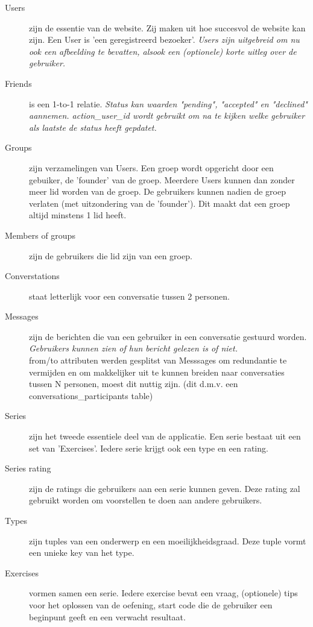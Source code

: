 \begin{description}
    \item[Users] zijn de essentie van de website. Zij maken uit hoe succesvol de website kan zijn.
        Een User is 'een geregistreerd bezoeker'. \textsl{Users zijn uitgebreid om nu ook een afbeelding
        te bevatten, alsook een (optionele) korte uitleg over de gebruiker.}
    \item[Friends] is een 1-to-1 relatie. \textsl{Status kan waarden "pending", "accepted" en "declined" aannemen.
        action\_user\_id wordt gebruikt om na te kijken welke gebruiker als laatste de status heeft gepdatet.}
    \item[Groups] zijn verzamelingen van Users. Een groep wordt opgericht door een gebuiker, de 'founder'
        van de groep. Meerdere Users kunnen dan zonder meer lid worden van de groep. De gebruikers kunnen
        nadien de groep verlaten (met uitzondering van de 'founder'). Dit maakt dat een groep altijd minstens
        1 lid heeft.
    \item[Members of groups] zijn de gebruikers die lid zijn van een groep.
    \item[Converstations] staat letterlijk voor een conversatie tussen 2 personen.
    \item[Messages] zijn de berichten die van een gebruiker in een conversatie gestuurd worden.
        \textsl{Gebruikers kunnen zien of hun bericht gelezen is of niet.} \\
        from/to attributen werden gesplitst van Messsages om redundantie te vermijden en om makkelijker
        uit te kunnen breiden naar conversaties tussen N personen, moest dit nuttig zijn. (dit d.m.v. een conversations\_participants table)
    \item[Series] zijn het tweede essentiele deel van de applicatie. Een serie bestaat uit een set
        van 'Exercises'. Iedere serie krijgt ook een type en een rating.
    \item[Series rating] zijn de ratings die gebruikers aan een serie kunnen geven. Deze rating
        zal gebruikt worden om voorstellen te doen aan andere gebruikers.
    \item[Types] zijn tuples van een onderwerp en een moeilijkheidsgraad. Deze tuple vormt een
        unieke key van het type.
    \item[Exercises] vormen samen een serie. Iedere exercise bevat een vraag, (optionele) tips voor
        het oplossen van de oefening, start code die de gebruiker een beginpunt geeft en een verwacht resultaat.

\end{description}
